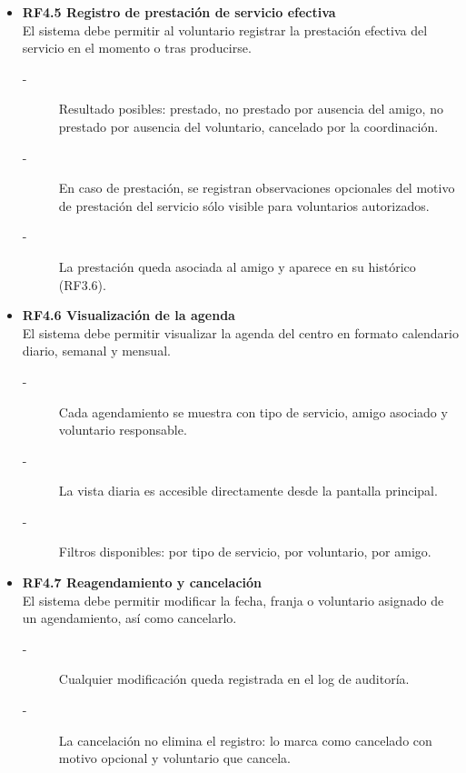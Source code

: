 \begin{itemize}
    \item \textbf{RF4.5 Registro de prestación de servicio efectiva} \\
    El sistema debe permitir al voluntario registrar la prestación efectiva
    del servicio en el momento o tras producirse.
    \begin{description}
        \item[-] Resultado posibles: prestado, no prestado por ausencia del amigo, no
        prestado por ausencia del voluntario, cancelado por la coordinación.
        \item[-] En caso de prestación, se registran observaciones opcionales del motivo de prestación del servicio 
        sólo visible para voluntarios autorizados.
        \item[-] La prestación queda asociada al amigo y aparece en su histórico (RF3.6).
    \end{description}
    
    \item \textbf{RF4.6 Visualización de la agenda} \\
    El sistema debe permitir visualizar la agenda del centro en formato calendario diario, semanal y mensual.
    \begin{description}
        \item[-] Cada agendamiento se muestra con tipo de servicio, amigo asociado y voluntario responsable.
        \item[-] La vista diaria es accesible directamente desde la pantalla principal.
        \item[-] Filtros disponibles: por tipo de servicio, por voluntario, por amigo.
    \end{description}
    
    \item \textbf{RF4.7 Reagendamiento y cancelación} \\
    El sistema debe permitir modificar la fecha, franja o voluntario asignado de un agendamiento, así como cancelarlo.
    \begin{description}
        \item[-] Cualquier modificación queda registrada en el log de auditoría.
        \item[-] La cancelación no elimina el registro: lo marca como cancelado con motivo opcional y voluntario que cancela.
    \end{description}
\end{itemize}




